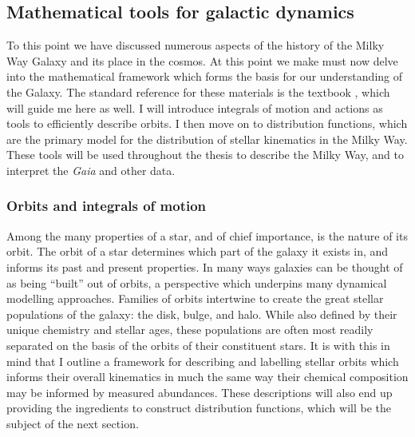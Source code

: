 







\subsection{Mathematical tools for galactic dynamics}

To this point we have discussed numerous aspects of the history of the Milky Way Galaxy and its place in the cosmos. At this point we make must now delve into the mathematical framework which forms the basis for our understanding of the Galaxy. The standard reference for these materials is the textbook \textcite{binney08}, which will guide me here as well. I will introduce integrals of motion and actions as tools to efficiently describe orbits. I then move on to distribution functions, which are the primary model for the distribution of stellar kinematics in the Milky Way. These tools will be used throughout the thesis to describe the Milky Way, and to interpret the \textit{Gaia} and other data.

\subsubsection{Orbits and integrals of motion}

Among the many properties of a star, and of chief importance, is the nature of its orbit. The orbit of a star determines which part of the galaxy it exists in, and informs its past and present properties. In many ways galaxies can be thought of as being ``built'' out of orbits, a perspective which underpins many dynamical modelling approaches. Families of orbits intertwine to create the great stellar populations of the galaxy: the disk, bulge, and halo. While also defined by their unique chemistry and stellar ages, these populations are often most readily separated on the basis of the orbits of their constituent stars. It is with this in mind that I outline a framework for describing and labelling stellar orbits which informs their overall kinematics in much the same way their chemical composition may be informed by measured abundances. These descriptions will also end up providing the ingredients to construct distribution functions, which will be the subject of the next section.

